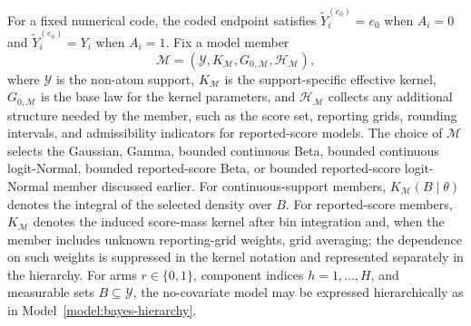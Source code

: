 \documentclass[11pt]{article}
\begin{document}
For a fixed numerical code, the coded endpoint satisfies $\widetilde{Y}_i^{(e_0)} = e_0$ when $A_i = 0$ and $\widetilde{Y}_i^{(e_0)} = Y_i$ when $A_i = 1$. Fix a model member
\[
  \mathcal M
  =
  (\mathcal Y,K_{\mathcal M},G_{0,\mathcal M},\mathcal H_{\mathcal M}),
\]
where $\mathcal Y$ is the non-atom support, $K_{\mathcal M}$ is the support-specific effective kernel, $G_{0,\mathcal M}$ is the base law for the kernel parameters, and $\mathcal H_{\mathcal M}$ collects any additional structure needed by the member, such as the score set, reporting grids, rounding intervals, and admissibility indicators for reported-score models. The choice of $\mathcal M$ selects the Gaussian, Gamma, bounded continuous Beta, bounded continuous logit-Normal, bounded reported-score Beta, or bounded reported-score logit-Normal member discussed earlier. For continuous-support members, $K_{\mathcal M}(B\mid\theta)$ denotes the integral of the selected density over $B$. For reported-score members, $K_{\mathcal M}$ denotes the induced score-mass kernel after bin integration and, when the member includes unknown reporting-grid weights, grid averaging; the dependence on such weights is suppressed in the kernel notation and represented separately in the hierarchy. For arms $r\in\{0,1\}$, component indices $h=1,\ldots,H$, and measurable sets $B\subseteq\mathcal Y$, the no-covariate model may be expressed hierarchically as in Model~\ref{model:bayes-hierarchy}.
\end{document}

